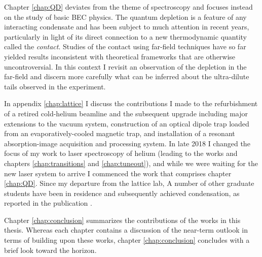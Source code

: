 	Chapter \ref{chap:QD} deviates from the theme of spectroscopy and focuses instead on the study of basic BEC physics. The quantum depletion is a feature of any interacting condensate and has been subject to much attention in recent years, particularly in light of its direct connection to a new thermodynamic quantity called the \emph{contact}. Studies of the contact using far-field techniques have so far yielded results inconsistent with theoretical frameworks that are otherwise uncontroversial. In this context I revisit an observation of the depletion in the far-field and discern more carefully what can be inferred about the ultra-dilute tails observed in the experiment. 

	In appendix \ref{chap:lattice} I discuss the contributions I made to the refurbishment of a retired cold-helium beamline and the subsequent upgrade including major extensions to the vacuum system, construction of  an optical dipole trap loaded from an evaporatively-cooled magnetic trap, and installation of a resonant absorption-image acquisition and processing system. In late 2018 I changed the focus of my work to laser spectroscopy of helium (leading to the works \cite{Henson22,Thomas20,Ross20} and chapters \ref{chap:transitions} and \ref{chap:tuneout}), and while we were waiting for the new laser system to arrive I commenced the work that comprises chapter \ref{chap:QD}. Since my departure from the lattice lab, A number of	other graduate students have been in residence and subsequently achieved condensation, as reported in the publication \cite{Abbas21}.
	
	Chapter \ref{chap:conclusion} summarizes the contributions of the works in this thesis. Whereas each chapter contains a discussion of the near-term outlook in terms of building upon these works, chapter \ref{chap:conclusion} concludes with a brief look toward the horizon.

	

